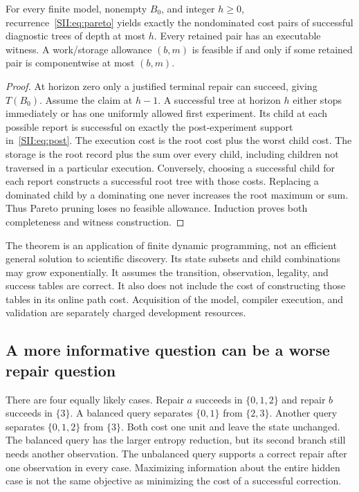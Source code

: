 \begin{SIItheorem}\label{SII:thm:synthesis}
For every finite model, nonempty $B_0$, and integer $h\geq0$, recurrence~\eqref{SII:eq:pareto} yields exactly the nondominated cost pairs of successful diagnostic trees of depth at most $h$. Every retained pair has an executable witness. A work/storage allowance $(b,m)$ is feasible if and only if some retained pair is componentwise at most $(b,m)$.
\end{SIItheorem}
\begin{proof}
At horizon zero only a justified terminal repair can succeed, giving $T(B_0)$. Assume the claim at $h-1$. A successful tree at horizon $h$ either stops immediately or has one uniformly allowed first experiment. Its child at each possible report is successful on exactly the post-experiment support in~\eqref{SII:eq:post}. The execution cost is the root cost plus the worst child cost. The storage is the root record plus the sum over every child, including children not traversed in a particular execution. Conversely, choosing a successful child for each report constructs a successful root tree with those costs. Replacing a dominated child by a dominating one never increases the root maximum or sum. Thus Pareto pruning loses no feasible allowance. Induction proves both completeness and witness construction.
\end{proof}

The theorem is an application of finite dynamic programming, not an efficient general solution to scientific discovery. Its state subsets and child combinations may grow exponentially. It assumes the transition, observation, legality, and success tables are correct. It also does not include the cost of constructing those tables in its online path cost. Acquisition of the model, compiler execution, and validation are separately charged development resources.

\subsection{A more informative question can be a worse repair question}
\begin{SIIcounterexample}\label{SII:ex:entropy}
There are four equally likely cases. Repair $a$ succeeds in $\{0,1,2\}$ and repair $b$ succeeds in $\{3\}$. A balanced query separates $\{0,1\}$ from $\{2,3\}$. Another query separates $\{0,1,2\}$ from $\{3\}$. Both cost one unit and leave the state unchanged. The balanced query has the larger entropy reduction, but its second branch still needs another observation. The unbalanced query supports a correct repair after one observation in every case. Maximizing information about the entire hidden case is not the same objective as minimizing the cost of a successful correction.
\end{SIIcounterexample}

